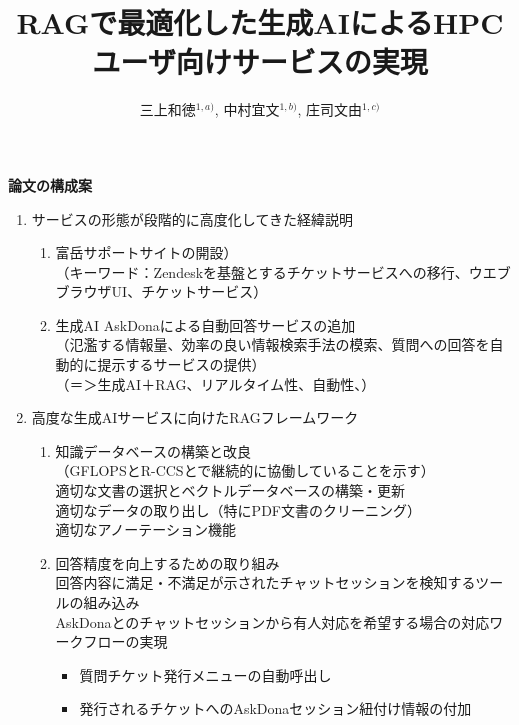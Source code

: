 \documentclass{jsaxiesproc}
\title{
	RAGで最適化した生成AIによるHPCユーザ向けサービスの実現
}
\author{
三上和徳$^{1,a)}$,
中村宜文$^{1,b)}$,
庄司文由$^{1,c)}$
}
\affiliation{
1) 理化学研究所 計算科学研究センター
}
\begin{document}
\maketitle


\textbf{論文の構成案}

\begin{enumerate}
\item サービスの形態が段階的に高度化してきた経緯説明

	\begin{enumerate}
		\item 富岳サポートサイトの開設）\\
		（キーワード：Zendeskを基盤とするチケットサービスへの移行、ウエブブラウザUI、チケットサービス）
		\item 生成AI AskDonaによる自動回答サービスの追加\\
		（氾濫する情報量、効率の良い情報検索手法の模索、質問への回答を自動的に提示するサービスの提供）\\
		（＝＞生成AI＋RAG、リアルタイム性、自動性、）
	\end{enumerate}

\item 高度な生成AIサービスに向けたRAGフレームワーク
	\begin{enumerate}
		\item 知識データベースの構築と改良\\
		（GFLOPSとR-CCSとで継続的に協働していることを示す）\\
		適切な文書の選択とベクトルデータベースの構築・更新\\
		適切なデータの取り出し（特にPDF文書のクリーニング）\\
		適切なアノーテーション機能

		\item 回答精度を向上するための取り組み\\
		回答内容に満足・不満足が示されたチャットセッションを検知するツールの組み込み\\
		AskDonaとのチャットセッションから有人対応を希望する場合の対応ワークフローの実現
		\begin{itemize}
			\item 質問チケット発行メニューの自動呼出し
			\item 発行されるチケットへのAskDonaセッション紐付け情報の付加
		\end{itemize}
	\end{enumerate}


\end{enumerate}
\end{document}
